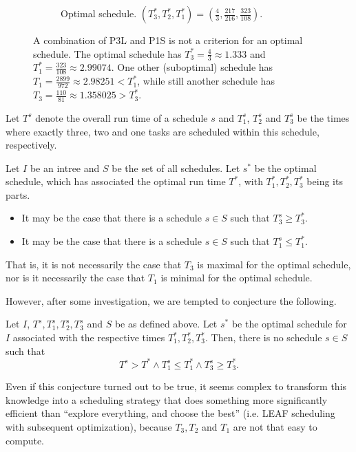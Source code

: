 \begin{figure}[ht]
\begin{subfigure}{.3\linewidth}
    \caption{Optimal schedule. $(T_3^*,T_2^*,T_1^*)=(\frac{4}{3},\frac{217}{216},\frac{323}{108})$.}
  \end{subfigure}
  \caption{A combination of P3L and P1S is not a criterion for an optimal schedule. The optimal schedule has $T_3^*=\frac{4}{3}\approx 1.333$ and $T_1^*=\frac{323}{108}\approx 2.99074$. One other (suboptimal) schedule has $T_1=\frac{2899}{972}\approx 2.98251 < T_1^*$, while still another schedule has $T_3=\frac{110}{81}\approx1.358025 > T_3^*$.}
  \label{fig:p3l-p1s-combo-suboptimal}
\end{figure}

\begin{corollary}
  Let $T^s$ denote the overall run time of a schedule $s$ and $T_1^s$, $T_2^s$ and $T_3^s$ be the times where exactly three, two and one tasks are scheduled within this schedule, respectively.

  Let $I$ be an intree and $S$ be the set of all schedules. Let $s^*$ be the optimal schedule, which has associated the optimal run time $T^*$, with $T_1^*, T_2^*, T_3^*$ being its parts.
  \begin{itemize}
  \item It may be the case that there is a schedule $s\in S$ such that $T_3^s \geq T_3^*$.
  \item It may be the case that there is a schedule $s\in S$ such that $T_1^s \leq T_1^*$.
  \end{itemize}
\end{corollary}

That is, it is not necessarily the case that $T_3$ is maximal for the optimal schedule, nor is it necessarily the case that $T_1$ is minimal for the optimal schedule.

However, after some investigation, we are tempted to conjecture the following.

\begin{conjecture}
  Let $I$, $T^s, T_1^s, T_2^s, T_3^s$ and $S$ be as defined above. Let $s^*$ be the optimal schedule for $I$ associated with the respective times $T_1^*, T_2^*, T_3^*$. Then, there is no schedule $s\in S$ such that
  \begin{equation*}
    T^s > T^* \wedge T_1^s \leq T_1^* \wedge T_3^s \geq T_3^*.
  \end{equation*}
\end{conjecture}

Even if this conjecture turned out to be true, it seems complex to transform this knowledge into a scheduling strategy that does something more significantly efficient than ``explore everything, and choose the best'' (i.e. LEAF scheduling with subsequent optimization), because $T_3, T_2$ and $T_1$ are not that easy to compute.

